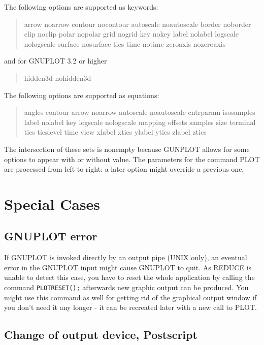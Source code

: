 The following options are supported as keywords:

\begin{quotation}
           arrow noarrow contour nocontour
            autoscale noautoscale border noborder clip noclip
            polar nopolar grid nogrid key nokey label nolabel
            logscale nologscale surface nosurface tics time notime
            zeroaxis nozeroaxis
\end{quotation}

and for GNUPLOT 3.2 or higher
\begin{quotation}
            hidden3d nohidden3d
\end{quotation}

The following options are supported as equations:
 
\begin{quotation}
                 angles contour
                 arrow noarrow autoscale noautoscale cntrparam isosamples
                 label nolabel key logscale nologscale mapping offsets
                 samples size terminal tics ticslevel time view
                 xlabel xtics ylabel ytics zlabel ztics
\end{quotation}

The intersection of these sets is nonempty because GUNPLOT
allows for some options to appear with or without value.
The parameters for the command PLOT are processed from left
to right: a later option might override a previous one.

\section{Special Cases}

\subsection{GNUPLOT error}

If GNUPLOT is invoked directly by an output pipe (UNIX only),
an eventual error in the GNUPLOT input might cause GNUPLOT to
quit. As {\small REDUCE} is unable to detect this case, you
have to reset the whole application by calling the 
command \verb+PLOTRESET();+ afterwards new graphic output
can be produced. You might use this command as well for
getting rid of the graphical output window if you don't need
it any longer - it can be recreated later with a new call to
PLOT.

\subsection{Change of output device, Postscript}

